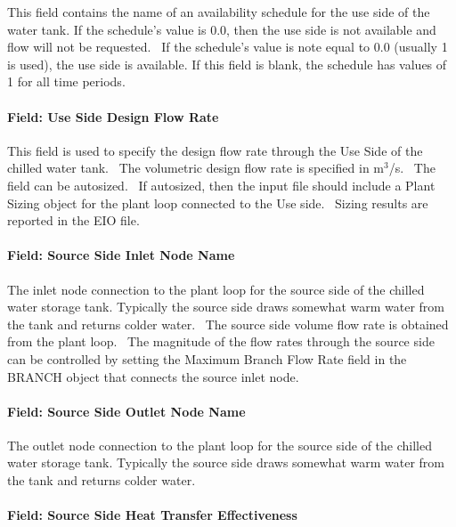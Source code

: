 This field contains the name of an availability schedule for the use side of the water tank. If the schedule's value is 0.0, then the use side is not available and flow will not be requested.~ If the schedule's value is note equal to 0.0 (usually 1 is used), the use side is available. If this field is blank, the schedule has values of 1 for all time periods.

\paragraph{Field: Use Side Design Flow Rate}\label{field-use-side-design-flow-rate}

This field is used to specify the design flow rate through the Use Side of the chilled water tank.~ The volumetric design flow rate is specified in m\(^{3}\)/s.~ The field can be autosized.~ If autosized, then the input file should include a Plant Sizing object for the plant loop connected to the Use side.~ Sizing results are reported in the EIO file.

\paragraph{Field: Source Side Inlet Node Name}\label{field-source-side-inlet-node-name-4}

The inlet node connection to the plant loop for the source side of the chilled water storage tank. Typically the source side draws somewhat warm water from the tank and returns colder water.~ The source side volume flow rate is obtained from the plant loop.~ The magnitude of the flow rates through the source side can be controlled by setting the Maximum Branch Flow Rate field in the BRANCH object that connects the source inlet node.

\paragraph{Field: Source Side Outlet Node Name}\label{field-source-side-outlet-node-name-4}

The outlet node connection to the plant loop for the source side of the chilled water storage tank. Typically the source side draws somewhat warm water from the tank and returns colder water.

\paragraph{Field: Source Side Heat Transfer Effectiveness}\label{field-source-side-heat-transfer-effectiveness}

